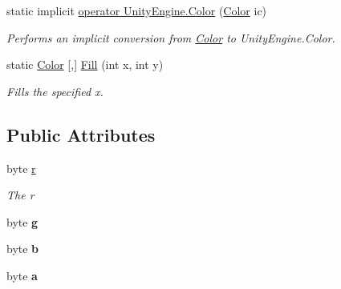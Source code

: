 \begin{DoxyCompactItemize}
static implicit \hyperlink{struct_lerp2_a_p_i_1_1_optimizers_1_1_color_ab441222f8fa3ecfa62d4413aec7a1860}{operator Unity\+Engine.\+Color} (\hyperlink{struct_lerp2_a_p_i_1_1_optimizers_1_1_color}{Color} ic)
\begin{DoxyCompactList}\small\item\em Performs an implicit conversion from \hyperlink{struct_lerp2_a_p_i_1_1_optimizers_1_1_color}{Color} to Unity\+Engine.\+Color. \end{DoxyCompactList}\item 
static \hyperlink{struct_lerp2_a_p_i_1_1_optimizers_1_1_color}{Color} \mbox{[},\mbox{]} \hyperlink{struct_lerp2_a_p_i_1_1_optimizers_1_1_color_a2f4d0ecb2a2e2209e09a5ce61047a8cf}{Fill} (int x, int y)
\begin{DoxyCompactList}\small\item\em Fills the specified x. \end{DoxyCompactList}\end{DoxyCompactItemize}
\subsection*{Public Attributes}
\begin{DoxyCompactItemize}
\item 
byte \hyperlink{struct_lerp2_a_p_i_1_1_optimizers_1_1_color_a222f7d917e0a461a91448f06ce9501d6}{r}
\begin{DoxyCompactList}\small\item\em The r \end{DoxyCompactList}\item 
\mbox{\label{struct_lerp2_a_p_i_1_1_optimizers_1_1_color_a0ce9d78fa20770a069d5842ef46bed76}} 
byte {\bfseries g}
\item 
\mbox{\label{struct_lerp2_a_p_i_1_1_optimizers_1_1_color_a678e662436251dcb8c8816af1ad1714a}} 
byte {\bfseries b}
\item 
\mbox{\label{struct_lerp2_a_p_i_1_1_optimizers_1_1_color_ad4617407758313622b97ad7f5f320720}} 
byte {\bfseries a}
\end{DoxyCompactItemize}
